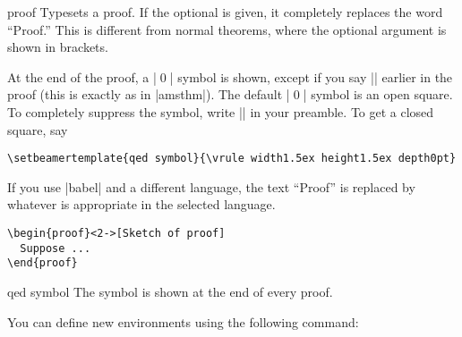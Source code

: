 \begin{environment}{{proof}}
  Typesets a proof. If the optional  is given, it completely replaces the word ``Proof.'' This is different from normal theorems, where the optional argument is shown in brackets.

  At the end of the proof, a |\qed| symbol is shown, except if you say |\qedhere| earlier in the proof (this is exactly as in |amsthm|). The default |\qed| symbol is an open square. To completely suppress the symbol, write |\def\qedsymbol{}| in your preamble. To get a closed square, say
\begin{verbatim}
\setbeamertemplate{qed symbol}{\vrule width1.5ex height1.5ex depth0pt}
\end{verbatim}

  If you use |babel| and a different language, the text ``Proof'' is replaced by whatever is appropriate in the selected language.

  \example
\begin{verbatim}
\begin{proof}<2->[Sketch of proof]
  Suppose ...
\end{proof}
\end{verbatim}

  \begin{element}{qed symbol}\yes\yes\yes
    The symbol is shown at the end of every proof.
  \end{element}
\end{environment}

You can define new environments using the following command:



